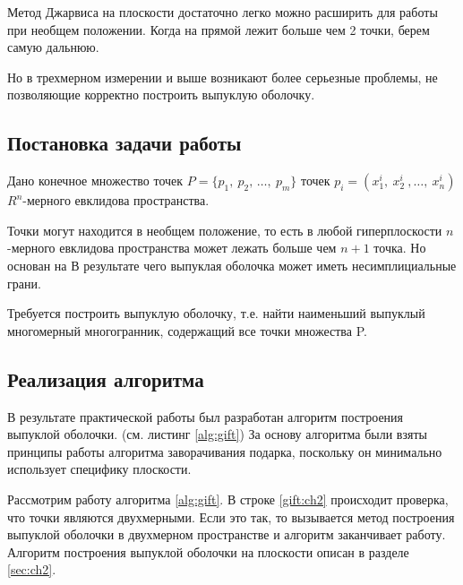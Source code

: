 \documentclass[a4paper,14pt]{extarticle}  %
\begin{document}
Метод Джарвиса на плоскости достаточно легко можно расширить для работы при необщем положении. Когда на прямой лежит больше чем 2 точки, берем самую дальнюю.

Но в трехмерном измерении и выше возникают более серьезные проблемы, не позволяющие корректно построить выпуклую оболочку.




\subsection{Постановка задачи работы}
Дано конечное множество точек $P=\{p_1,\ p_2,\,\ldots,\ p_m\}$ точек $p_i=(x_{1}^{i},\ x_{2}^{i}\ ,\ldots,\ x_{n}^{i})$ $R^n$-мерного евклидова пространства.

Точки могут находится в необщем положение, то есть в любой гиперплоскости $n$-мерного евклидова пространства может лежать больше чем $n+1$ точка.
Но основан на
В результате чего выпуклая оболочка может иметь несимплициальные грани.

Требуется построить выпуклую оболочку, т.е. найти наименьший выпуклый многомерный многогранник, содержащий все точки множества P.

\subsection{Реализация алгоритма}
В результате практической работы был разработан алгоритм построения выпуклой оболочки. (см. листинг \ref{alg:gift})
За основу алгоритма были взяты принципы работы алгоритма заворачивания подарка, поскольку он минимально использует специфику плоскости.

Рассмотрим работу алгоритма \ref{alg:gift}. В строке \ref{gift:ch2} происходит проверка, что точки являются двухмерными. Если это так, то вызывается метод построения выпуклой оболочки в двухмерном пространстве и алгоритм заканчивает работу. Алгоритм построения выпуклой оболочки на плоскости описан в разделе \ref{sec:ch2}.
\end{document}
